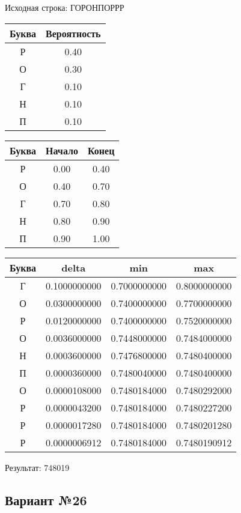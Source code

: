 \documentclass[a4paper, 12pt]{article}
\begin{document}
Исходная строка: ГОРОНПОРРР\
\begin{center}
 \begin{tabular}{ |c|c| } 
  \hline
     Буква & Вероятность \\ \hline
Р & 0.40\\\hline
О & 0.30\\\hline
Г & 0.10\\\hline
Н & 0.10\\\hline
П & 0.10
\\ \hline \end{tabular}
\end{center}
\begin{center}
 \begin{tabular}{ |c|c|c| } 
  \hline
     Буква & Начало & Конец \\ \hline
Р & 0.00 & 0.40\\\hline
О & 0.40 & 0.70\\\hline
Г & 0.70 & 0.80\\\hline
Н & 0.80 & 0.90\\\hline
П & 0.90 & 1.00
\\ \hline \end{tabular}
\end{center}
\begin{center}
 \begin{tabular}{ |c|c|c|c| } 
  \hline
     Буква & delta & min & max \\ \hline
Г & 0.1000000000 & 0.7000000000 & 0.8000000000\\\hline
О & 0.0300000000 & 0.7400000000 & 0.7700000000\\\hline
Р & 0.0120000000 & 0.7400000000 & 0.7520000000\\\hline
О & 0.0036000000 & 0.7448000000 & 0.7484000000\\\hline
Н & 0.0003600000 & 0.7476800000 & 0.7480400000\\\hline
П & 0.0000360000 & 0.7480040000 & 0.7480400000\\\hline
О & 0.0000108000 & 0.7480184000 & 0.7480292000\\\hline
Р & 0.0000043200 & 0.7480184000 & 0.7480227200\\\hline
Р & 0.0000017280 & 0.7480184000 & 0.7480201280\\\hline
Р & 0.0000006912 & 0.7480184000 & 0.7480190912
\\ \hline \end{tabular}
\end{center}
Результат: 748019
\pagebreak
\subsection{Вариант №26}
\end{document}
